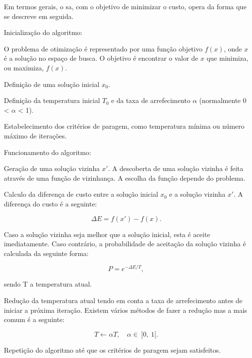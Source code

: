 Em termos gerais, o \gls{sa}, com o objetivo de minimizar o custo, opera da forma que se descreve em seguida.

Inicialização do algoritmo:

\begin{compactitem}
    \item O problema de otimização é representado por uma função objetivo $f(x)$, onde $x$ é a solução no espaço de busca. O objetivo é encontrar o valor de $x$ que minimiza, ou maximiza, $f(x)$.

    \item Definição de uma solução inicial $x_0$.

    \item Definição da temperatura inicial $T_0$ e da taxa de arrefecimento $\alpha$ (normalmente 0 < $\alpha$ < 1).

    \item Estabelecimento dos critérios de paragem, como temperatura mínima ou número máximo de iterações.
\end{compactitem}

Funcionamento do algoritmo:

\begin{compactitem}
    \item Geração de uma solução vizinha $x'$. A descoberta de uma solução vizinha é feita através de uma função de vizinhança. A escolha da função depende do problema.

    \item Calculo da diferença de custo entre a solução inicial $x_0$ e a solução vizinha $x'$. A diferença do custo é a seguinte:

    \begin{equation}
        \Delta E = f(x') - f(x).
    \end{equation}

    Caso a solução vizinha seja melhor que a solução inicial, esta é aceite imediatamente. Caso contrário, a probabilidade de aceitação da solução vizinha é calculada da seguinte forma:

    \begin{equation}
        P = e^{-\Delta E/T},
    \end{equation}

    sendo T a temperatura atual.

    \item Redução da temperatura atual tendo em conta a taxa de arrefecimento antes de iniciar a próxima iteração. Existem vários métodos de fazer a redução mas a mais comum é a seguinte:

    \begin{equation}
        T \leftarrow \alpha T, \quad \alpha \in \ \rbrack 0, \ 1 \lbrack.
    \end{equation}

    \item Repetição do algoritmo até que os critérios de paragem sejam satisfeitos.
\end{compactitem}

